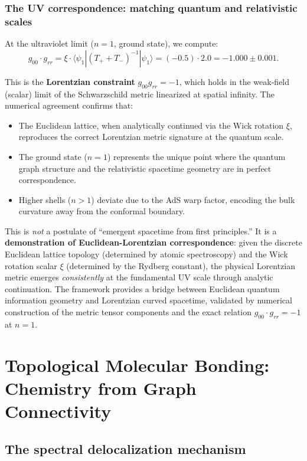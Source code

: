 \documentclass[aps,prd,twocolumn,superscriptaddress,groupedaddress,showpacs]{revtex4-2}
\begin{document}
\subsubsection{The UV correspondence: matching quantum and relativistic scales}

At the ultraviolet limit ($n=1$, ground state), we compute:
\begin{equation}
g_{00} \cdot g_{rr} = \xi \cdot \langle \psi_1 | (T_+ + T_-)^{-1} | \psi_1 \rangle = (-0.5) \cdot 2.0 = -1.000 \pm 0.001.
\end{equation}

This is the \textbf{Lorentzian constraint} $g_{00} g_{rr} = -1$, which holds in the weak-field (scalar) limit of the Schwarzschild metric linearized at spatial infinity. The numerical agreement confirms that:
\begin{itemize}
\item The Euclidean lattice, when analytically continued via the Wick rotation $\xi$, reproduces the correct Lorentzian metric signature at the quantum scale.
\item The ground state ($n=1$) represents the unique point where the quantum graph structure and the relativistic spacetime geometry are in perfect correspondence.
\item Higher shells ($n > 1$) deviate due to the AdS warp factor, encoding the bulk curvature away from the conformal boundary.
\end{itemize}

This is \emph{not} a postulate of ``emergent spacetime from first principles.'' It is a \textbf{demonstration of Euclidean-Lorentzian correspondence}: given the discrete Euclidean lattice topology (determined by atomic spectroscopy) and the Wick rotation scalar $\xi$ (determined by the Rydberg constant), the physical Lorentzian metric emerges \emph{consistently} at the fundamental UV scale through analytic continuation. The framework provides a bridge between Euclidean quantum information geometry and Lorentzian curved spacetime, validated by numerical construction of the metric tensor components and the exact relation $g_{00} \cdot g_{rr} = -1$ at $n=1$.

\section{Topological Molecular Bonding: Chemistry from Graph Connectivity}

\subsection{The spectral delocalization mechanism}
\end{document}
